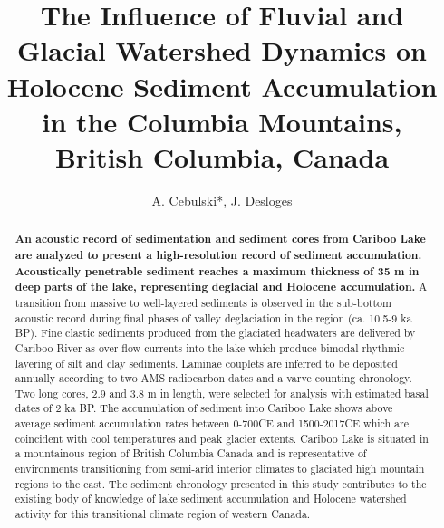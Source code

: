 \documentclass[Royal,times,doublespace,sageh]{sagej}
\begin{document}

\title{The Influence of Fluvial and Glacial Watershed Dynamics on
Holocene Sediment Accumulation in the Columbia Mountains, British
Columbia, Canada}


\author{A. Cebulski*, J. Desloges}




\begin{abstract}
\textbf{An acoustic record of sedimentation and sediment cores from
Cariboo Lake are analyzed to present a high-resolution record of
sediment accumulation. Acoustically penetrable sediment reaches a
maximum thickness of 35 m in deep parts of the lake, representing
deglacial and Holocene accumulation.} A transition from massive to
well-layered sediments is observed in the sub-bottom acoustic record
during final phases of valley deglaciation in the region (ca. 10.5-9 ka
BP). Fine clastic sediments produced from the glaciated headwaters are
delivered by Cariboo River as over-flow currents into the lake which
produce bimodal rhythmic layering of silt and clay sediments. Laminae
couplets are inferred to be deposited annually according to two AMS
radiocarbon dates and a varve counting chronology. Two long cores, 2.9
and 3.8 m in length, were selected for analysis with estimated basal
dates of 2 ka BP. The accumulation of sediment into Cariboo Lake shows
above average sediment accumulation rates between 0-700CE and
1500-2017CE which are coincident with cool temperatures and peak glacier
extents. Cariboo Lake is situated in a mountainous region of British
Columbia Canada and is representative of environments transitioning from
semi-arid interior climates to glaciated high mountain regions to the
east. The sediment chronology presented in this study contributes to the
existing body of knowledge of lake sediment accumulation and Holocene
watershed activity for this transitional climate region of western
Canada.
\end{abstract}

\end{document}
